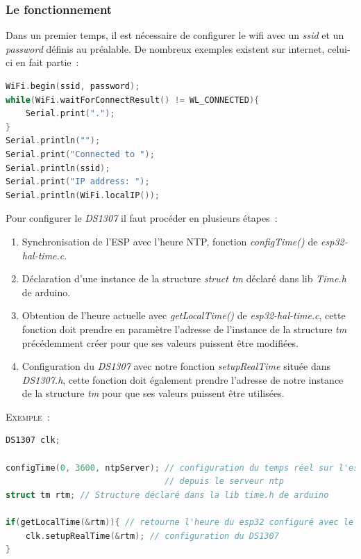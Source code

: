        \subsubsection{Le fonctionnement}

        Dans un premier temps, il est nécessaire de configurer le wifi avec un \textit{ssid} et un \textit{password} définis au préalable. De nombreux exemples existent sur internet, celui-ci en fait partie~:

\begin{lstlisting}[style=myC, caption=Initialisation du wifi dans le main, language=C, frame=lines]
WiFi.begin(ssid, password);
while(WiFi.waitForConnectResult() != WL_CONNECTED){      
    Serial.print(".");
}
Serial.println("");
Serial.print("Connected to ");
Serial.println(ssid);
Serial.print("IP address: ");
Serial.println(WiFi.localIP());  
\end{lstlisting}

        \vspace{.2 cm}
        \noindent
        Pour configurer le \textit{DS1307} il faut procéder en plusieurs étapes~:
        \begin{enumerate}
            \item Synchronisation de l'ESP avec l'heure NTP, fonction \textit{configTime()} de \textit{esp32-hal-time.c}.
            \item Déclaration d'une instance de la structure \textit{struct tm} déclaré dans lib \textit{Time.h} de arduino.
            \item Obtention de l'heure actuelle avec \textit{getLocalTime()} de \textit{esp32-hal-time.c}, cette fonction doit prendre en paramètre l'adresse de l'instance de la structure \textit{tm} précédemment créer pour que ses valeurs puissent être modifiées. 
            \item Configuration du \textit{DS1307} avec notre fonction \textit{setupRealTime} située dans \textit{DS1307.h}, cette fonction doit également prendre l'adresse de notre instance de la structure \textit{tm} pour que ses valeurs puissent être utilisées.
        \end{enumerate}

        \vspace{.5 cm}

        \noindent
        \textsc{Exemple~:}
        
\begin{lstlisting}[style=myC, caption=Configuration du DS1307, language=C, frame=lines]
DS1307 clk;

configTime(0, 3600, ntpServer); // configuration du temps réel sur l'esp
                                // depuis le serveur ntp
struct tm rtm; // Structure déclaré dans la lib time.h de arduino

if(getLocalTime(&rtm)){ // retourne l'heure du esp32 configuré avec le ntp
    clk.setupRealTime(&rtm); // configuration du DS1307
}
\end{lstlisting}

